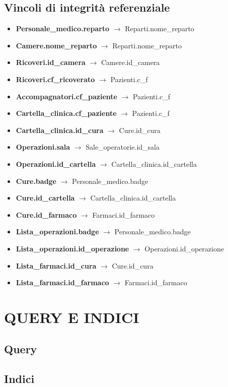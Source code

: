 \documentclass[a4paper, 10pt]{article}
\begin{document}
\subsection{Vincoli di integrità referenziale}
\begin{spacing}{0.4}
\begin{itemize}
    \item \textbf{Personale\_medico.reparto} $\to$ Reparti.nome\_reparto
    \item \textbf{Camere.nome\_reparto} $\to$ Reparti.nome\_reparto
    \item \textbf{Ricoveri.id\_camera} $\to$ Camere.id\_camera
    \item \textbf{Ricoveri.cf\_ricoverato} $\to$ Pazienti.c\_f
    \item \textbf{Accompagnatori.cf\_paziente} $\to$ Pazienti.c\_f
    \item \textbf{Cartella\_clinica.cf\_paziente} $\to$ Pazienti.c\_f
    \item \textbf{Cartella\_clinica.id\_cura} $\to$ Cure.id\_cura
    \item \textbf{Operazioni.sala} $\to$ Sale\_operatorie.id\_sala
    \item \textbf{Operazioni.id\_cartella} $\to$ Cartella\_clinica.id\_cartella
    \item \textbf{Cure.badge} $\to$ Personale\_medico.badge
    \item \textbf{Cure.id\_cartella} $\to$ Cartella\_clinica.id\_cartella
    \item \textbf{Cure.id\_farmaco} $\to$ Farmaci.id\_farmaco
    \item \textbf{Lista\_operazioni.badge} $\to$ Personale\_medico.badge
    \item \textbf{Lista\_operazioni.id\_operazione} $\to$ Operazioni.id\_operazione
    \item \textbf{Lista\_farmaci.id\_cura} $\to$ Cure.id\_cura
    \item \textbf{Lista\_farmaci.id\_farmaco} $\to$ Farmaci.id\_farmaco
\end{itemize}
\end{spacing}
\section{QUERY E INDICI}
\subsection{Query}
\subsection{Indici}
\end{document}

